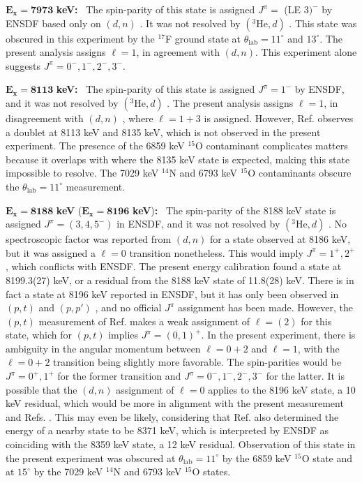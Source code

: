 \emph{$\mathbf{E_{x} = 7973}$} \textbf{keV:} \, 
The spin-parity of this state is assigned $J^{\pi} =$ (LE $3)^{-}$ by ENSDF based only on $(d,n)$ \cite{Fuchs1969}. It was not resolved by $(^{3}\mathrm{He},d)$ \cite{Erskine1966,Seth1967,Cage1971}. This state was obscured in this experiment by the $^{17}$F ground state at $\theta_{\mathrm{lab}} = 11^{\circ}$ and $13^{\circ}$. The present analysis assigns $\ell=1$, in agreement with $(d,n)$. This experiment alone suggests $J^{\pi} = 0^{-}, 1^{-}, 2^{-}, 3^{-}$.

\emph{$\mathbf{E_{x} = 8113}$} \textbf{keV:} \, 
The spin-parity of this state is assigned $J^{\pi} = 1^{-}$ by ENSDF, and it was not resolved by $(^{3}\mathrm{He},d)$ \cite{Erskine1966,Seth1967,Cage1971}. The present analysis assigns $\ell=1$, in disagreement with $(d,n)$ \cite{Fuchs1969}, where $\ell=1+3$ is assigned. However, Ref. \cite{Fuchs1969} observes a doublet at 8113 keV and 8135 keV, which is not observed in the present experiment. The presence of the 6859 keV $^{15}$O contaminant complicates matters because it overlaps with where the 8135 keV state is expected, making this state impossible to resolve. The 7029 keV $^{14}$N and 6793 keV $^{15}$O contaminants obscure the $\theta_{\mathrm{lab}} = 11^{\circ}$ measurement.

\emph{$\mathbf{E_{x} = 8188}$} \textbf{keV} (\emph{$\mathbf{E_{x} = 8196}$} \textbf{keV})\textbf{:} \, 
The spin-parity of the 8188 keV state is assigned $J^{\pi} = (3,4,5^{-})$ in ENSDF, and it was not resolved by $(^{3}\mathrm{He},d)$ \cite{Erskine1966,Seth1967,Cage1971}. No spectroscopic factor was reported from $(d,n)$ \cite{Fuchs1969} for a state observed at 8186 keV, but it was assigned a $\ell=0$ transition nonetheless. This would imply $J^{\pi} = 1^{+},2^{+}$, which conflicts with ENSDF. The present energy calibration found a state at 8199.3(27) keV, or a residual from the 8188 keV state of 11.8(28) keV. There is in fact a state at 8196 keV reported in ENSDF, but it has only been observed in $(p,t)$ \cite{Seth1974,Seth1977} and $(p,p')$ \cite{Nolen1975}, and no official $J^{\pi}$ assignment has been made. However, the $(p,t)$ measurement of Ref. \cite{Seth1977} makes a weak assignment of $\ell=(2)$ for this state, which for $(p,t)$ implies $J^{\pi} = (0,1)^{+}$. In the present experiment, there is ambiguity in the angular momentum between $\ell=0+2$ and $\ell=1$, with the $\ell=0+2$ transition being slightly more favorable. The spin-parities would be $J^{\pi} = 0^{+},1^{+}$ for the former transition and $J^{\pi} = 0^{-},1^{-},2^{-},3^{-}$ for the latter. It is possible that the $(d,n)$ \cite{Fuchs1969} assignment of $\ell=0$ applies to the 8196 keV state, a 10 keV residual, which would be more in alignment with the present measurement and Refs. \cite{Seth1974,Seth1977,Nolen1975}. This may even be likely, considering that Ref. \cite{Fuchs1969} also determined the energy of a nearby state to be 8371 keV, which is interpreted by ENSDF as coinciding with the 8359 keV state, a 12 keV residual. Observation of this state in the present experiment was obscured at $\theta_{\mathrm{lab}} = 11^{\circ}$ by the 6859 keV $^{15}$O state and at $15^{\circ}$ by the 7029 keV $^{14}$N and 6793 keV $^{15}$O states.

